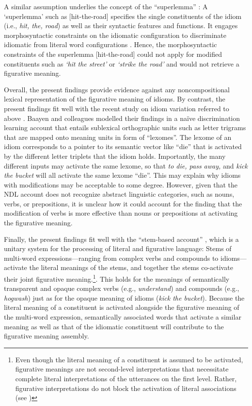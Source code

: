A similar assumption underlies the concept of the ``superlemma'' \citep{sprenger:2006}: A ‘superlemma’ such as [hit-the-road] specifies the single constituents of the idiom (i.e., \textit{hit, the, road}) as well as their syntactic features and functions. It engages morphosyntactic constraints on the idiomatic configuration to discriminate idiomatic from literal word configurations \citep{sprenger:2006}. Hence, the morphosyntactic constraints of the superlemma [hit-the-road] could not apply for modified constituents such as \textit{‘hit the street’} or \textit{‘strike the road’} and would not retrieve a figurative meaning. 


Overall, the present findings provide evidence against any noncompositional lexical representation of the figurative meaning of idioms. By contrast, the present findings fit well with the recent study on idiom variation referred to above \citep{geeraert:2017}. Baayen and colleagues modelled their findings in a naïve discrimination learning account \citep{baayen:2013,baayen:2011,baayen:2016} that entails sublexical orthographic units such as letter trigrams that are mapped onto meaning units in form of ``lexomes''. The lexome of an idiom corresponds to a pointer to its semantic vector like ``die'' that is activated by the different letter triplets that the idiom holds. Importantly, the many different inputs may activate the same lexome, so that \textit{to die, pass away,} and \textit{kick the bucket} will all activate the same lexome ``die''. This may explain why idioms with modifications may be acceptable to some degree. However, given that the NDL account does not recognize abstract linguistic categories, such as nouns, verbs, or prepositions, it is unclear how it could account for the finding that the modification of verbs is more effective than nouns or prepositions at activating the figurative meaning. 

Finally, the present findings fit well with the ``stem-based account'' \citep{gunther:2018,rabanus:2008,smolka:2015,smolka:2017,smolka:2018,smolka:2014,smolka:2007}, which is a unitary system for the processing of literal and figurative language: Stems of multi-word expressions—ranging from complex verbs and compounds to idioms—activate the literal meanings of the stems, and together the stems co-activate their joint figurative meaning.\footnote{Even though the literal meaning of a constituent is assumed to be activated, figurative meanings are not second-level interpretations that necessitate complete literal interpretations of the utterances on the first level. Rather, figurative interpretations do not block the activation of literal associations (see \citealt{gibbs:2002})}. This holds for the meanings of semantically transparent and opaque complex verbs (e.g., \textit{understand}) and compounds (e.g., \textit{hogwash}) just as for the opaque meaning of idioms (\textit{kick the bucket}). Because the literal meaning of a constituent is activated alongside the figurative meaning of the multi-word expression, semantically associated words that activate a similar meaning as well as that of the idiomatic constituent will contribute to the figurative meaning assembly. 

